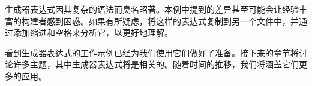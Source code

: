 生成器表达式因其复杂的语法而臭名昭著。本例中提到的差异甚至可能会让经验丰富的构建者感到困惑。如果有所疑虑，将这样的表达式复制到另一个文件中，并通过添加缩进和空格来分析它，以更好地理解。

看到生成器表达式的工作示例已经为我们使用它们做好了准备。接下来的章节将讨论许多主题，其中生成器表达式将是相关的。随着时间的推移，我们将涵盖它们更多的应用。






